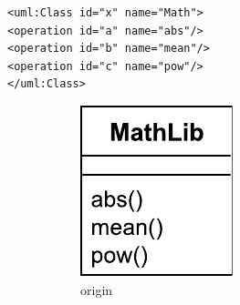 \documentclass{jot}
\begin{document}
\vspace{-15pt}
\begin{minipage}[t]{0.61\linewidth} 
\centering
\begin{lstlisting}[style=eol,caption={The simplified XMI of the model in Fig. \ref{fig:origin}.},label=lst:originxmi]
<uml:Class id="x" name="Math">
<operation id="a" name="abs"/>
<operation id="b" name="mean"/>
<operation id="c" name="pow"/>
</uml:Class>
\end{lstlisting}
\vspace{-10pt}
\begin{figure}[H]
    \centering    
    \hfill
    \begin{subfigure}[t]{0.2\linewidth}
        \centering
        \includegraphics[width=\linewidth]{OriginalClassDiagram}
        \caption{origin}
        \label{fig:origin}
    \end{subfigure}
    \hfill
    \begin{subfigure}[t]{0.2\linewidth}
        \centering

\end{subfigure}
\end{figure}
\end{minipage}
\end{document}
